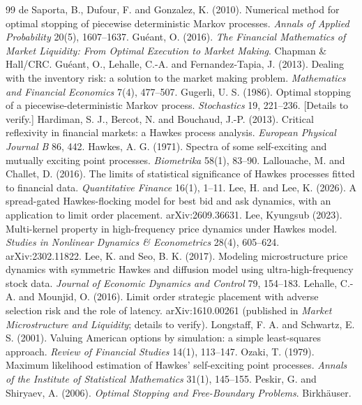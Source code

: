 \documentclass[11pt]{article}
\theoremstyle{definition}
\theoremstyle{remark}
\begin{document}
\begin{thebibliography}{99}
 de Saporta, B., Dufour, F. and Gonzalez, K. (2010). Numerical method for optimal stopping of piecewise deterministic Markov processes. \emph{Annals of Applied Probability} 20(5), 1607--1637.
 Gu\'eant, O. (2016). \emph{The Financial Mathematics of Market Liquidity: From Optimal Execution to Market Making}. Chapman \& Hall/CRC.
 Gu\'eant, O., Lehalle, C.-A. and Fernandez-Tapia, J. (2013). Dealing with the inventory risk: a solution to the market making problem. \emph{Mathematics and Financial Economics} 7(4), 477--507.
 Gugerli, U. S. (1986). Optimal stopping of a piecewise-deterministic Markov process. \emph{Stochastics} 19, 221--236. [Details to verify.]
 Hardiman, S. J., Bercot, N. and Bouchaud, J.-P. (2013). Critical reflexivity in financial markets: a Hawkes process analysis. \emph{European Physical Journal B} 86, 442.
 Hawkes, A. G. (1971). Spectra of some self-exciting and mutually exciting point processes. \emph{Biometrika} 58(1), 83--90.
 Lallouache, M. and Challet, D. (2016). The limits of statistical significance of Hawkes processes fitted to financial data. \emph{Quantitative Finance} 16(1), 1--11.
 Lee, H. and Lee, K. (2026). A spread-gated Hawkes-flocking model for best bid and ask dynamics, with an application to limit order placement. arXiv:2609.36631.
 Lee, Kyungsub (2023). Multi-kernel property in high-frequency price dynamics under Hawkes model. \emph{Studies in Nonlinear Dynamics \& Econometrics} 28(4), 605--624. arXiv:2302.11822.
 Lee, K. and Seo, B. K. (2017). Modeling microstructure price dynamics with symmetric Hawkes and diffusion model using ultra-high-frequency stock data. \emph{Journal of Economic Dynamics and Control} 79, 154--183.
 Lehalle, C.-A. and Mounjid, O. (2016). Limit order strategic placement with adverse selection risk and the role of latency. arXiv:1610.00261 (published in \emph{Market Microstructure and Liquidity}; details to verify).
 Longstaff, F. A. and Schwartz, E. S. (2001). Valuing American options by simulation: a simple least-squares approach. \emph{Review of Financial Studies} 14(1), 113--147.
 Ozaki, T. (1979). Maximum likelihood estimation of Hawkes' self-exciting point processes. \emph{Annals of the Institute of Statistical Mathematics} 31(1), 145--155.
 Peskir, G. and Shiryaev, A. (2006). \emph{Optimal Stopping and Free-Boundary Problems}. Birkh\"auser.

\end{thebibliography}
\end{document}

